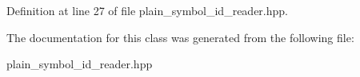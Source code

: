 Definition at line 27 of file plain\-\_\-symbol\-\_\-id\-\_\-reader.\-hpp.



The documentation for this class was generated from the following file\-:\begin{DoxyCompactItemize}
\item 
plain\-\_\-symbol\-\_\-id\-\_\-reader.\-hpp\end{DoxyCompactItemize}
